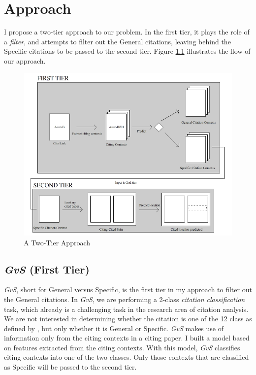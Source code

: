 \chapter{Approach}
\label{approach}
I propose a two-tier approach to our problem. In the first tier, it plays the role of a \textit{filter}, and attempts to filter out the General citations, leaving behind the Specific citations to be passed to the second tier. Figure \ref{fig:twotier} illustrates the flow of our approach.
\begin{figure}[h]
  \centering
  \includegraphics[scale=0.60]{./twotier}
  \caption{A Two-Tier Approach}
  \label{fig:twotier}
\end{figure}

\section{{\it GvS} (First Tier)}
\label{firsttier}
{\it GvS}, short for General versus Specific, is the first tier in my approach to filter out the General citations. In {\it GvS}, we are performing a 2-class \textit{citation classification} task, which already is a challenging task in the research area of citation analysis. We are not interested in determining whether the citation is one of the 12 class as defined by \cite{teufel2009annotation}, but only whether it is General or Specific. {\it GvS} makes use of information only from the citing contexts in a citing paper. I built a model based on features extracted from the citing contexts. With this model, {\it GvS} classifies citing contexts into one of the two classes. Only those contexts that are classified as Specific will be passed to the second tier.

